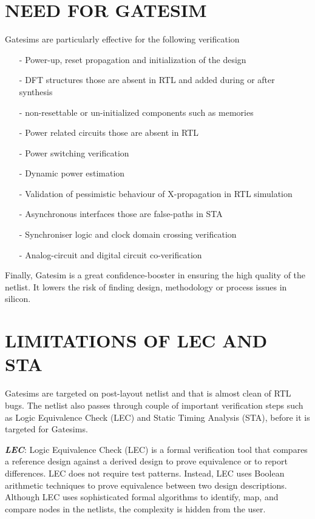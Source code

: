 \section {NEED FOR GATESIM}
Gatesims are particularly effective for the following verification
\begin{itemize}
	\item[-]Power-up, reset propagation and initialization of the design
	\item[-]DFT structures those are absent in RTL and added during or after synthesis
	\item[-]non-resettable or un-initialized components such as memories
	\item[-]Power related circuits those are absent in RTL
	\item[-]Power switching verification
	\item[-]Dynamic power estimation
	\item[-]Validation of pessimistic behaviour of X-propagation in RTL simulation
	\item[-]Asynchronous interfaces those are false-paths in STA
	\item[-]Synchroniser logic and clock domain crossing verification
	\item[-]Analog-circuit and digital circuit co-verification
\end{itemize}

Finally, Gatesim is a great confidence-booster in ensuring the high quality of the netlist. It lowers the risk of finding design, methodology or process issues in silicon.




\section{LIMITATIONS OF LEC AND STA}

Gatesims are targeted on post-layout netlist and that is almost clean of RTL bugs. The netlist also passes through couple of important verification steps such as Logic Equivalence Check (LEC) and Static Timing Analysis (STA), before it is targeted for Gatesims.

\emph {\bf LEC}: Logic Equivalence Check (LEC) is a formal verification tool that compares a reference design against a derived design to prove equivalence or to report differences.  LEC does not require test patterns. Instead, LEC uses Boolean arithmetic techniques to prove equivalence between two design descriptions\cite{ieee:boolean}. Although LEC uses sophisticated formal algorithms to identify, map, and compare nodes in the netlists, the complexity is hidden from the user\cite{lec}. %

